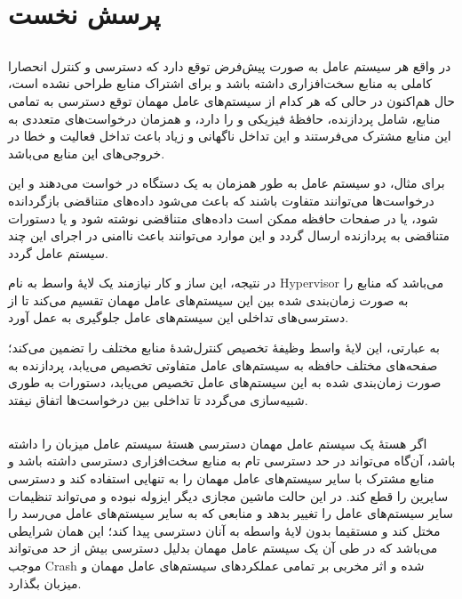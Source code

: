 \section{پرسش نخست}
\subsection{}
در واقع هر سیستم عامل به صورت پیش‌فرض توقع دارد که دسترسی و کنترل انحصارا کاملی به منابع سخت‌افزاری داشته باشد و برای 
اشتراک منابع طراحی نشده است، حال هم‌اکنون در حالی که هر کدام از سیستم‌های عامل مهمان توقع دسترسی
به تمامی منابع، شامل پردازنده، حافظهٔ فیزیکی و  را دارد،
و همزمان درخواست‌های متعددی به این منابع مشترک می‌فرستند و این تداخل ناگهانی و زیاد
باعث تداخل فعالیت و خطا در خروجی‌های این منابع می‌باشد.
\par
برای مثال، دو سیستم عامل به طور همزمان به یک دستگاه  در خواست می‌دهند و این درخواست‌ها
می‌توانند متفاوت باشند که باعث می‌شود داده‌های متناقضی بازگردانده شود، یا در صفحات حافظه ممکن است داده‌های متناقضی نوشته شود
و یا دستورات متناقضی به پردازنده ارسال گردد و این موارد می‌توانند باعث ناامنی در اجرای این چند سیستم عامل گردد.
\par
در نتیجه، این ساز و کار نیازمند یک لایهٔ واسط به نام Hypervisor می‌باشد
که منابع را به صورت زمان‌بندی شده بین این سیستم‌های عامل مهمان تقسیم می‌کند تا از دسترسی‌های تداخلی این سیستم‌های عامل جلوگیری به عمل آورد.
\par
به عبارتی، این لایهٔ واسط وظیفهٔ تخصیص کنترل‌شدهٔ منابع مختلف را تضمین می‌کند؛ صفحه‌های مختلف حافظه به سیستم‌های عامل
متفاوتی تخصیص می‌یابد، پردازنده به صورت زمان‌بندی شده به این سیستم‌های عامل تخصیص می‌یابد، دستورات 
به طوری شبیه‌سازی می‌گردد تا تداخلی بین درخواست‌ها اتفاق نیفتد.

\subsection{}
اگر هستهٔ یک سیستم عامل مهمان دسترسی هستهٔ سیستم عامل میزبان را داشته باشد، آن‌گاه می‌تواند در حد دسترسی تام به منابع سخت‌افزاری 
دسترسی داشته باشد و منابع مشترک با سایر سیستم‌های عامل مهمان را به تنهایی استفاده کند و دسترسی سایرین را قطع کند.
در این حالت ماشین مجازی دیگر ایزوله نبوده و می‌تواند تنظیمات سایر سیستم‌های عامل را تغییر بدهد و منابعی که به سایر سیستم‌های عامل می‌رسد را مختل کند و مستقیما بدون لایهٔ واسطه به آنان دسترسی پیدا کند؛
این همان شرایطی می‌باشد که در طی آن یک سیستم عامل مهمان بدلیل دسترسی بیش از حد می‌تواند موجب Crash شده و اثر مخربی بر تمامی عملکرد‌های سیستم‌های 
عامل مهمان و میزبان بگذارد.


